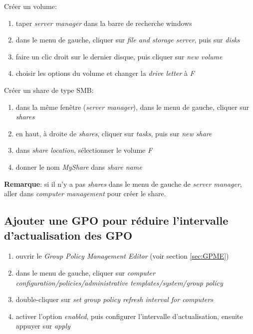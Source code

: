 \documentclass[a4paper]{article}
\begin{document}
Créer un volume:
\begin{enumerate}
    \item taper \textit{server manager} dans la barre de recherche windows
    \item dans le menu de gauche, cliquer sur \textit{file and storage server}, puis sur \textit{disks}
    \item faire un clic droit sur le dernier disque, puis cliquer sur \textit{new volume}
    \item choisir les options du volume et changer la \textit{drive letter} à \textit{F}
\end{enumerate}
Créer un share de type SMB:
\begin{enumerate}
    \item dans la même fenêtre (\textit{server manager}), dans le menu de gauche, cliquer sur \textit{shares}
    \item en haut, à droite de \textit{shares}, cliquer sur \textit{tasks}, puis sur \textit{new share}
    \item dans \textit{share location}, sélectionner le volume \textit{F}
    \item donner le nom \textit{MyShare} dans \textit{share name}
\end{enumerate}
\textbf{Remarque}: si il n'y a pas \textit{shares} dans le menu de gauche de \textit{server manager}, aller dans \textit{computer management} pour créer le share.





\subsection{Ajouter une GPO pour réduire l'intervalle d'actualisation des GPO}



\begin{enumerate}
    \item ouvrir le \textit{Group Policy Management Editor} (voir section \ref{sec:GPME})
    \item dans le menu de gauche, cliquer sur \textit{computer configuration/policies/administrative templates/system/group policy}
    \item double-cliquer sur \textit{set group policy refresh interval for computers}
    \item activer l'option \textit{enabled}, puis configurer l'intervalle d'actualisation, ensuite appuyer sur \textit{apply}
\end{enumerate}
\end{document}
